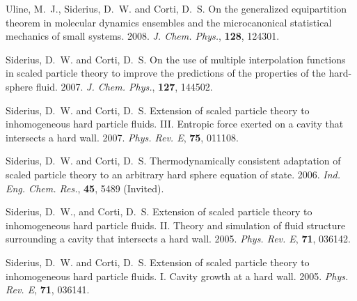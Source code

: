 Uline, M.~J., Siderius, D.~W. and Corti, D.~S. On the generalized equipartition theorem in molecular dynamics ensembles and the microcanonical statistical mechanics of small systems. 2008. {\it J. Chem. Phys.}, {\bf 128}, 124301.

Siderius, D.~W. and Corti, D.~S. On the use of multiple interpolation functions in scaled particle theory to improve the predictions of the properties of the hard-sphere fluid. 2007. {\it J. Chem. Phys.}, {\bf 127}, 144502.

Siderius, D.~W. and Corti, D.~S. Extension of scaled particle theory to inhomogeneous hard particle fluids. III. Entropic force exerted on a cavity that intersects a hard wall. 2007. {\it Phys. Rev. E}, {\bf 75}, 011108.

Siderius, D.~W. and Corti, D.~S. Thermodynamically consistent adaptation of scaled particle theory to an arbitrary hard sphere equation of state. 2006. {\it Ind. Eng. Chem. Res.}, {\bf 45}, 5489 (Invited).

Siderius, D.~W., and Corti, D.~S. Extension of scaled particle theory to inhomogeneous hard particle fluids. II. Theory and simulation of fluid structure surrounding a cavity that intersects a hard wall. 2005. {\it Phys. Rev. E}, {\bf 71}, 036142.

Siderius, D.~W. and Corti, D.~S. Extension of scaled particle theory to inhomogeneous hard particle fluids. I. Cavity growth at a hard wall. 2005. {\it Phys. Rev. E}, {\bf 71}, 036141.
